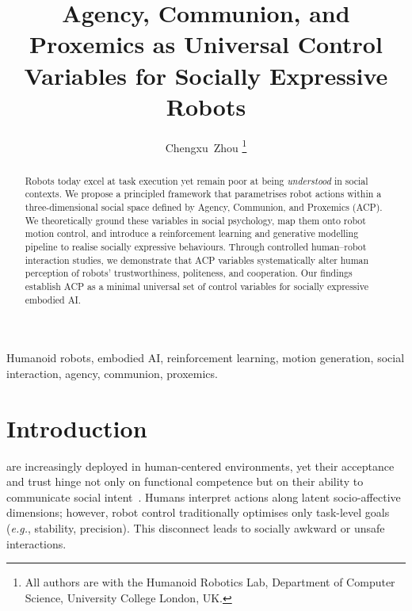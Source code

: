 \documentclass[journal]{IEEEtran}
\begin{document}
\title{Agency, Communion, and Proxemics as Universal Control Variables for Socially Expressive Robots}

\author{Chengxu~Zhou \thanks{All authors are with the Humanoid Robotics Lab, Department of Computer Science, University College London, UK.}}


\maketitle

\begin{abstract}
Robots today excel at task execution yet remain poor at being \emph{understood} in social contexts. We propose a principled framework that parametrises robot actions within a three-dimensional social space defined by Agency, Communion, and Proxemics (ACP). We theoretically ground these variables in social psychology, map them onto robot motion control, and introduce a reinforcement learning and generative modelling pipeline to realise socially expressive behaviours. Through controlled human--robot interaction studies, we demonstrate that ACP variables systematically alter human perception of robots' trustworthiness, politeness, and cooperation. Our findings establish ACP as a minimal universal set of control variables for socially expressive embodied AI.
\end{abstract}

\begin{IEEEkeywords}
Humanoid robots, embodied AI, reinforcement learning, motion generation, social interaction, agency, communion, proxemics.
\end{IEEEkeywords}

\section{Introduction}\label{sec:intro}
 are increasingly deployed in human-centered environments, yet their acceptance and trust hinge not only on functional competence but on their ability to communicate social intent~\cite{belkaid2021gaze}. Humans interpret actions along latent socio-affective dimensions; however, robot control traditionally optimises only task-level goals (\emph{e.g.}, stability, precision). This disconnect leads to socially awkward or unsafe interactions.
\end{document}
